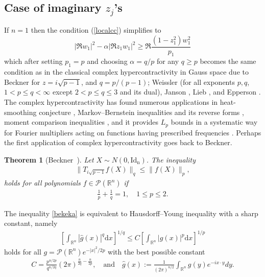 \documentclass[9pt, a4paper]{amsart}
\newcommand{\1}{{\chi_{}}}%
\newtheorem{atheorem}{Theorem}[section]
\numberwithin{equation}{section}
\begin{document}
\subsection{Case of imaginary $z_{j}$'s} 
If $n=1$ then the condition (\ref{localcc}) simplifies to 
$$
|\Re w_{1}|^{2}-\alpha | \Re z_{1} w_{1}|^{2} \geq \Re \frac{(1-z_{1}^{2})w_{1}^{2}}{p_{1}}
$$
which after setting $p_{1}=p$ and choosing $\alpha=q/p$ for any $q\geq p$ becomes the same condition  as in the classical complex hypercontractivity in Gauss space due to Beckner \cite{Beckner} for $z=i\sqrt{p-1}$, and $q=p/(p-1)$;  Weissler \cite{Wei} (for all exponents $p,q$,  $1<p\leq q<\infty$ except $2<p\leq q \leq 3$ and its dual),  Janson \cite{Jans}, Lieb \cite{Lieb},  and Epperson \cite{Epp}. The complex hypercontractivity has found numerous applications in heat-smoothing conjecture \cite{IvaniEsk1,MenNaor}, Markov--Bernstein inequalities and its reverse forms \cite{IE}, moment comparison inequalities \cite{IvTk, IE}, and it provides $L_{p}$  bounds in a systematic way for Fourier multipliers acting on functions having prescribed frequencies \cite{IvNa, IE}. Perhaps the first application of complex hypercontractivity goes back to Beckner.

\begin{atheorem}[Beckner~\cite{Beckner}]\label{bekth}
Let $X \sim N(0, \mathrm{Id_{n}})$. The inequality
\begin{align}\label{bekeka}
\|T_{i \sqrt{p-1}}f(X)\|_{q}\leq \| f(X)\|_{p},
\end{align}
holds for all polynomials $f \in \mathcal{P}(\mathbb{R}^{n})$ if 
\begin{align*}
    \frac{1}{p}+\frac{1}{q}=1, \quad 1\leq p\leq 2. 
\end{align*}
\end{atheorem}
The inequality \eqref{bekeka} is equivalent to Hausdorff--Young inequality with a sharp constant, namely 
\begin{align}\label{HS1}
\left[\int_{\mathbb{R}^{n}}\left|\widehat{g}\left(x\right)\right|^{q} \mathrm{d}x\right]^{1/q}\leq C\left[\int_{\mathbb{R}^{n}}\left|g\left(x \right)\right|^{p} \mathrm{d}x\right]^{1/p}
\end{align}
holds for all $g= \mathcal{P}(\mathbb{R}^{n})e^{-|x|^{2}/2p}$ with the best possible constant 
\begin{align*}
C=\frac{p^{n/2p}}{q^{n/2q}} (2\pi)^{\frac{n}{2q}-\frac{n}{2p}}, \quad \text{and} \quad  \widehat{g}(x):= \frac{1}{(2\pi)^{n/2}} \int_{\mathbb{R}^{n}} g(y) e^{-i x \cdot y}dy. 
\end{align*}
\end{document}
